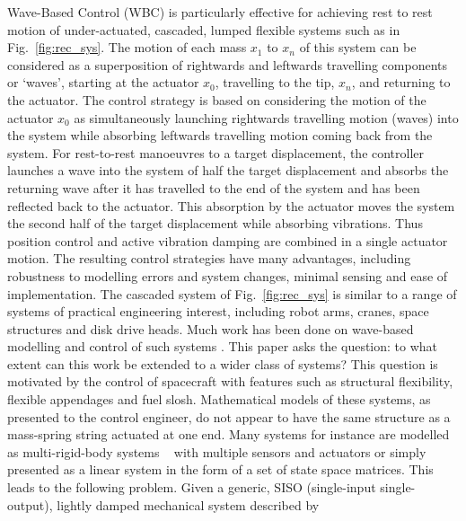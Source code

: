 \documentclass{mbd_fullpaper}
\begin{document}
Wave-Based Control (WBC) is particularly effective for achieving rest to rest motion of under-actuated, cascaded, lumped flexible systems such as in Fig.~\ref{fig:rec_sys}. The motion of each mass $x_1$ to $x_n$ of this system can be considered as a superposition of rightwards and leftwards travelling components or ‘waves’, starting at the actuator $x_0$, travelling to the tip, $x_n$, and returning to the actuator. The control strategy is based on considering the motion of the actuator $x_0$ as simultaneously launching rightwards travelling motion (waves) into the system while absorbing leftwards travelling motion coming back from the system. For rest-to-rest manoeuvres to a target displacement, the controller launches a wave into the system of half the target displacement and absorbs the returning wave after it has travelled to the end of the system and has been reflected back to the actuator. This absorption by the actuator moves the system the second half of the target displacement while absorbing vibrations. Thus position control and active vibration damping are combined in a single actuator motion. The resulting control strategies have many advantages, including robustness to modelling errors and system changes, minimal sensing and ease of implementation.
The cascaded system of Fig.~\ref{fig:rec_sys} is similar to a range of systems of practical engineering interest, including robot arms, cranes, space structures and disk drive heads. Much work has been done on wave-based modelling and control of such systems \cite{OConnor2011, Connor2005}. This paper asks the question: to what extent can this work be extended to a wider class of systems? 
This question is motivated by the control of spacecraft with features such as structural flexibility, flexible appendages and fuel slosh.
Mathematical models of these systems, as presented to the control engineer, do not appear to have the same structure as a mass-spring string actuated at one end.
Many systems for instance are modelled as multi-rigid-body systems ~\cite{Kane1980} with multiple sensors and actuators or simply presented as a linear system in the form of a set of state space matrices.
This leads to the following problem. Given a generic, SISO (single-input single-output), lightly damped mechanical system described by
\end{document}
